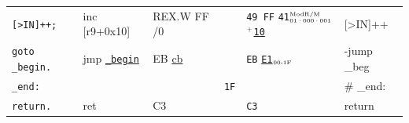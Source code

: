 \documentclass[a4paper,12pt,final]{article}
\begin{document}
\begin{table}[!htbp]
\begin{adjustwidth}{-1cm}{-1cm}
\begin{center}
\begin{tabular}{l|ll|l|lH}
\hspace{1.053000em} \texttt{[>IN]++;} & inc [r9+0x10] & REX.W FF /0 &  & \texttt{49 FF} \texttt{41}​\(^{\text{\tiny ModR/M}}_{\text{\tiny 01·000·001}}\) \(^{\text{\tiny +}}\)​\uline{\texttt{10}} & [>IN]++\\[0pt]
\hspace{1.053000em} \texttt{goto \_begin.} & jmp \uline{\texttt{\_begin}} & EB \uline{cb} &  & \texttt{EB} \uline{\texttt{E1}}​\(_{\text{\tiny 00-1F}}\) & -jump \_beg\\[0pt]
\texttt{\_end:} &  &  & \texttt{1F} &  & \# \_end:\\[0pt]
\hspace{1.053000em} \texttt{return.} & ret & C3 &  & \texttt{C3} & return\\[0pt]
\end{tabular}

\end{center}
\normalsize \end{adjustwidth} \end{table} \vspace{0}
\end{document}
